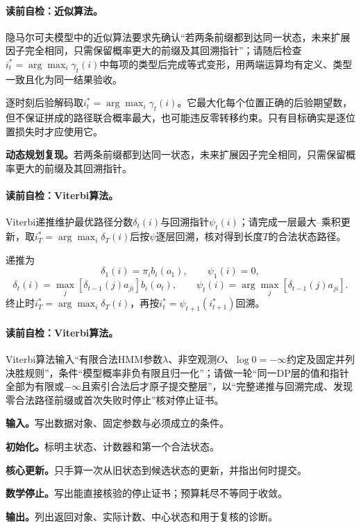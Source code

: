 \paragraph{读前自检：近似算法。}隐马尔可夫模型中的近似算法要求先确认“若两条前缀都到达同一状态，未来扩展因子完全相同，只需保留概率更大的前缀及其回溯指针”；请随后检查$i_t^*=\arg\max_i\gamma_t(i)$中每项的类型后完成等式变形，用两端运算均有定义、类型一致且化为同一结果验收。\par

逐时刻后验解码取$i_t^*=\arg\max_i\gamma_t(i)$。它最大化每个位置正确的后验期望数，但不保证拼成的路径联合概率最大，也可能违反零转移约束。只有目标确实是逐位置损失时才应使用它。

\label{replay:V3-C05-S05-PRE-SQ-008}
\textbf{动态规划复现。}若两条前缀都到达同一状态，未来扩展因子完全相同，只需保留概率更大的前缀及其回溯指针。

\paragraph{读前自检：Viterbi算法。}Viterbi递推维护最优路径分数$\delta_t(i)$与回溯指针$\psi_t(i)$；请完成一层最大--乘积更新，取$i_T^*=\arg\max_i\delta_T(i)$后按$\psi$逐层回溯，核对得到长度$T$的合法状态路径。\par

递推为
\[
\delta_1(i)=\pi_i b_i(o_1),\qquad\psi_1(i)=0,
\]
\[
\delta_t(i)=\max_j[\delta_{t-1}(j)a_{ji}]b_i(o_t),
\qquad
\psi_t(i)=\arg\max_j[\delta_{t-1}(j)a_{ji}].
\]
终止时$i_T^*=\arg\max_i\delta_T(i)$，再按$i_t^*=\psi_{t+1}(i_{t+1}^*)$回溯。

\paragraph{读前自检：Viterbi算法。}Viterbi算法输入“有限合法HMM参数$\lambda$、非空观测$O$、$\log0=-\infty$约定及固定并列决胜规则”，条件“模型概率非负有限且归一化”；请做一轮“同一DP层的值和指针全部为有限或$-\infty$且索引合法后才原子提交整层”，以“完整递推与回溯完成、发现零合法路径前缀或首次失败时停止”核对停止证书。\par


\begin{keypointbox}[title={对数域Viterbi算法：五步阅读}]
\textbf{输入。}写出数据对象、固定参数与必须成立的条件。\par
\textbf{初始化。}标明主状态、计数器和第一个合法状态。\par
\textbf{核心更新。}只手算一次从旧状态到候选状态的更新，并指出何时提交。\par
\textbf{数学停止。}写出能直接核验的停止证书；预算耗尽不等同于收敛。\par
\textbf{输出。}列出返回对象、实际计数、中心状态和用于复核的诊断。
\end{keypointbox}

